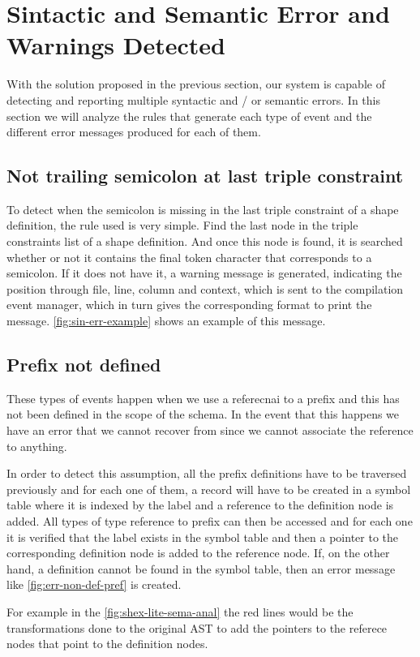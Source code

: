 \section{Sintactic and Semantic Error and Warnings Detected}
With the solution proposed in the previous section, our system is capable of detecting and reporting multiple syntactic
and / or semantic errors. In this section we will analyze the rules that generate each type of event and the different
error messages produced for each of them.

\subsection{Not trailing semicolon at last triple constraint}
To detect when the semicolon is missing in the last triple constraint of a shape definition, the rule used is very simple.
Find the last node in the triple constraints list of a shape definition. And once this node is found, it is searched whether or
not it contains the final token character that corresponds to a semicolon. If it does not have it, a warning message is generated,
indicating the position through file, line, column and context, which is sent to the compilation event manager, which in turn gives
the corresponding format to print the message. \cref{fig:sin-err-example} shows an example of this message.

\subsection{Prefix not defined}
These types of events happen when we use a referecnai to a prefix and this has not been defined in the scope of the schema.
In the event that this happens we have an error that we cannot recover from since we cannot associate the reference to anything.

In order to detect this assumption, all the prefix definitions have to be traversed previously and for each one of them,
a record will have to be created in a symbol table where it is indexed by the label and a reference to the definition node
is added. All types of type reference to prefix can then be accessed and for each one it is verified that the label exists
in the symbol table and then a pointer to the corresponding definition node is added to the reference node. If, on the other hand,
a definition cannot be found in the symbol table, then an error message like \cref{fig:err-non-def-pref} is created.

For example in the \cref{fig:shex-lite-sema-anal} the red lines would be the transformations done to the original AST to
add the pointers to the referece nodes that point to the definition nodes.

